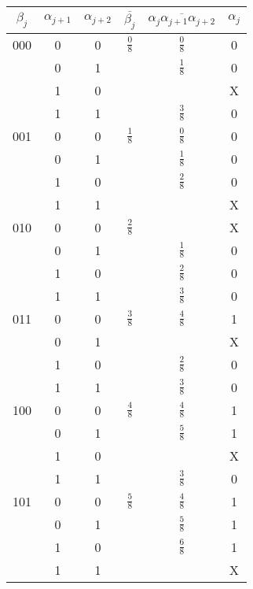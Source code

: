 \renewcommand{\arraystretch}{1.2}
\begin{center}
\begin{table}
\begin{tabular}{|c|c|c||c|c||c|}
\hline
$\beta_j$ & $\alpha_{j+1}$ & $\alpha_{j+2}$ & $\overline{\beta_j}$ & $\overline{\alpha_j\alpha_{j+1}\alpha_{j+2}}$ & $\alpha_j$\\
\hline
000 & 0 & 0 & $\frac{0}{8}$ & $\frac{0}{8}$ & 0\\
    & 0 & 1 &               & $\frac{1}{8}$ & 0\\
    & 1 & 0 &               &               & X\\
    & 1 & 1 &               & $\frac{3}{8}$ & 0\\
\hline
001 & 0 & 0 & $\frac{1}{8}$ & $\frac{0}{8}$ & 0\\
    & 0 & 1 &               & $\frac{1}{8}$ & 0\\
    & 1 & 0 &               & $\frac{2}{8}$ & 0\\
    & 1 & 1 &               &               & X\\
\hline
010 & 0 & 0 & $\frac{2}{8}$ &               & X\\
    & 0 & 1 &               & $\frac{1}{8}$ & 0\\
    & 1 & 0 &               & $\frac{2}{8}$ & 0\\
    & 1 & 1 &               & $\frac{3}{8}$ & 0\\
\hline
011 & 0 & 0 & $\frac{3}{8}$ & $\frac{4}{8}$ & 1\\
    & 0 & 1 &               &               & X\\
    & 1 & 0 &               & $\frac{2}{8}$ & 0\\
    & 1 & 1 &               & $\frac{3}{8}$ & 0\\
\hline
100 & 0 & 0 & $\frac{4}{8}$ & $\frac{4}{8}$ & 1\\
    & 0 & 1 &               & $\frac{5}{8}$ & 1\\
    & 1 & 0 &               &               & X\\
    & 1 & 1 &               & $\frac{3}{8}$ & 0\\
\hline
101 & 0 & 0 & $\frac{5}{8}$ & $\frac{4}{8}$ & 1\\
    & 0 & 1 &               & $\frac{5}{8}$ & 1\\
    & 1 & 0 &               & $\frac{6}{8}$ & 1\\
    & 1 & 1 &               &               & X\\
\hline

\end{tabular}
\end{table}
\end{center}
